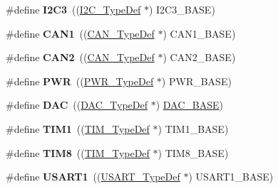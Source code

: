 \begin{DoxyCompactItemize}
\#define {\bfseries I2\+C3}~((\hyperlink{struct_i2_c___type_def}{I2\+C\+\_\+\+Type\+Def} $\ast$) I2\+C3\+\_\+\+B\+A\+SE)
\item 
\mbox{\label{group___peripheral__declaration_ga4964ecb6a5c689aaf8ee2832b8093aac}} 
\#define {\bfseries C\+A\+N1}~((\hyperlink{struct_c_a_n___type_def}{C\+A\+N\+\_\+\+Type\+Def} $\ast$) C\+A\+N1\+\_\+\+B\+A\+SE)
\item 
\mbox{\label{group___peripheral__declaration_gac5e4c86ed487dc91418b156e24808033}} 
\#define {\bfseries C\+A\+N2}~((\hyperlink{struct_c_a_n___type_def}{C\+A\+N\+\_\+\+Type\+Def} $\ast$) C\+A\+N2\+\_\+\+B\+A\+SE)
\item 
\mbox{\label{group___peripheral__declaration_ga04651c526497822a859942b928e57f8e}} 
\#define {\bfseries P\+WR}~((\hyperlink{struct_p_w_r___type_def}{P\+W\+R\+\_\+\+Type\+Def} $\ast$) P\+W\+R\+\_\+\+B\+A\+SE)
\item 
\mbox{\label{group___peripheral__declaration_ga4aa2a4ab86ce00c23035e5cee2e7fc7e}} 
\#define {\bfseries D\+AC}~((\hyperlink{struct_d_a_c___type_def}{D\+A\+C\+\_\+\+Type\+Def} $\ast$) \hyperlink{group___peripheral__memory__map_gad18d0b914c7f68cecbee1a2d23a67d38}{D\+A\+C\+\_\+\+B\+A\+SE})
\item 
\mbox{\label{group___peripheral__declaration_ga2e87451fea8dc9380056d3cfc5ed81fb}} 
\#define {\bfseries T\+I\+M1}~((\hyperlink{struct_t_i_m___type_def}{T\+I\+M\+\_\+\+Type\+Def} $\ast$) T\+I\+M1\+\_\+\+B\+A\+SE)
\item 
\mbox{\label{group___peripheral__declaration_ga9a3660400b17735e91331f256095810e}} 
\#define {\bfseries T\+I\+M8}~((\hyperlink{struct_t_i_m___type_def}{T\+I\+M\+\_\+\+Type\+Def} $\ast$) T\+I\+M8\+\_\+\+B\+A\+SE)
\item 
\mbox{\label{group___peripheral__declaration_ga92871691058ff7ccffd7635930cb08da}} 
\#define {\bfseries U\+S\+A\+R\+T1}~((\hyperlink{struct_u_s_a_r_t___type_def}{U\+S\+A\+R\+T\+\_\+\+Type\+Def} $\ast$) U\+S\+A\+R\+T1\+\_\+\+B\+A\+SE)
\item 

\end{DoxyCompactItemize}
